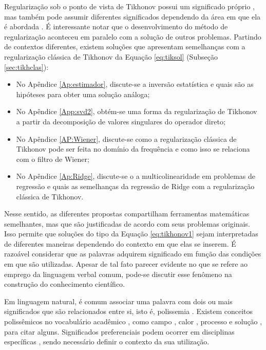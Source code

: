 Regularização sob o ponto de vista de Tikhonov possui um significado próprio \cite{tikhonov1977solutions}, mas também pode assumir diferentes significados dependendo da área em que ela é abordada \cite{Chen2002}. É interessante notar que o desenvolvimento do método de regularização aconteceu em paralelo com a solução de outros problemas. Partindo de contextos diferentes, existem soluções que apresentam semelhanças com a regularização clássica de Tikhonov da Equação \eqref{eq:tiksol} (Subseção \ref{sec:tikhclas}):

\begin{itemize}



\item No Apêndice \ref{Ap:estimador}, discute-se a inversão estatística e quais são as hipóteses para obter uma solução análoga;

\item No Apêndice \ref{App:svd2}, obtém-se uma forma da regularização de Tikhonov a partir da decomposição de valores singulares do operador direto;

\item No Apêndice \ref{AP:Wiener}, discute-se como a regularização clássica de Tikhonov pode ser feita no domínio da frequência e como isso se relaciona com o filtro de Wiener;

\item No Apêndice \ref{Ap:Ridge}, discute-se o a multicolinearidade em problemas de regressão e quais as semelhanças da regressão de Ridge com a regularização clássica de Tikhonov.
\end{itemize}

Nesse sentido, as diferentes propostas compartilham ferramentas matemáticas semelhantes, mas que são justificadas de acordo com seus problemas originais. Isso permite que soluções do tipo da Equação \eqref{eq:tikhonov1} sejam interpretadas de diferentes maneiras dependendo do contexto em que elas se inserem. É razoável considerar que as palavras adquirem significado em função das condições em que são utilizadas. Apesar de tal fato parecer evidente no que se refere ao emprego da linguagem verbal comum, pode-se discutir esse fenômeno na construção do conhecimento científico. 

Em linguagem natural, é comum associar uma palavra com dois ou mais significados que são relacionados entre si, isto é, polissemia \cite{Falkum2015, Vicente2017}. Existem conceitos polissêmicos no vocabulário acadêmico \cite{Skoufaki2021}, como campo \cite{Krapas2008}, calor \cite{Strmdahl2011}, processo \cite{Hyland2007} e solução \cite{Mudraya2006}, para citar alguns. Significados preferenciais podem ocorrer em disciplinas específicas \cite{Hyland2007}, sendo necessário definir o contexto da sua utilização. 

